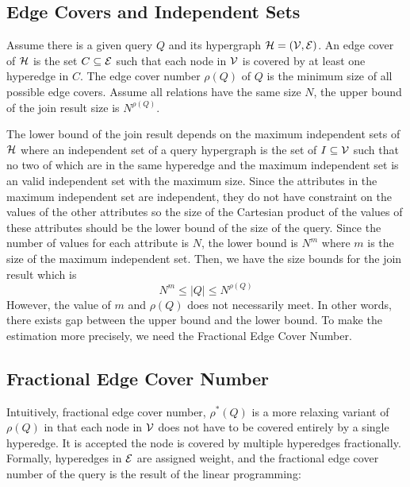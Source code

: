 \subsection{Edge Covers and Independent Sets}

Assume there is a given query $Q$ and its hypergraph $\mathcal{H}=(\mathcal{V}, \mathcal{E})$. An edge cover of $\mathcal{H}$ is the set $C \subseteq \mathcal{E}$ such that each node in $\mathcal{V}$ is covered by at least one hyperedge in $C$. The edge cover number $\rho(Q)$ of $Q$ is the minimum size of all possible edge covers. Assume all relations have the same size $N$, the upper bound of the join result size is $N^{\rho(Q)}$.

The lower bound of the join result depends on the maximum independent sets of $\mathcal{H}$ 
where an independent set of a query hypergraph is the set of $I \subseteq \mathcal{V}$ such that no two of which are in the same hyperedge and the maximum independent set is an valid independent set with the maximum size. Since the attributes in the maximum independent set are independent, they do not have constraint on the values of the other attributes so the size of the Cartesian product of the values of these attributes should be the lower bound of the size of the query. Since the number of values for each attribute is $N$, the lower bound is $N^{m}$ where $m$ is the size of the maximum independent set. Then, we have the size bounds for the join result which is 
$$N^m  \leq |Q| \leq N^{\rho(Q)}$$
However, the value of $m$ and $\rho(Q)$ does not necessarily meet. In other words, there exists gap between the upper bound and the lower bound. To make the estimation more precisely, we need the Fractional Edge Cover Number.

\subsection{Fractional Edge Cover Number}

Intuitively, fractional edge cover number, $\rho^*(Q)$ is a more relaxing variant of $\rho(Q)$ in that each node in $\mathcal{V}$ does not have to be covered entirely by a single hyperedge. It is accepted the node is covered by multiple hyperedges fractionally. Formally, hyperedges in $\mathcal{E}$ are assigned weight, and the fractional edge cover number of the query is the result of the linear programming:





